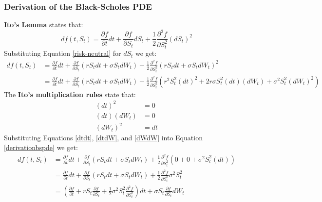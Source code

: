 \documentclass[12pt]{article}
\numberwithin{equation}{section}
\begin{document}
\subsubsection{Derivation of the Black-Scholes PDE}
\textbf{Ito's Lemma} states that:
\begin{equation}
	df(t,S_t) = \frac{\partial f}{\partial t} dt + \frac {\partial f}{\partial S_t} dS_t + \frac{1}{2}\frac{\partial^2 f}{\partial S_t^2}(dS_t)^2
	\label{ito}
\end{equation}
Substituting Equation \ref{risk-neutral} for $dS_t$ we get:
\begin{equation}
	\begin{aligned}
		df(t,S_t) 
		&= \frac{\partial f}{\partial t} dt 
		+ \frac{\partial f}{\partial S_t}
		\left(rS_tdt + \sigma S_t dW_t\right) 
		+ \frac{1}{2}\frac{\partial^2 f}{\partial S_t^2}
		\left(rS_tdt + \sigma S_t dW_t\right)^2 \\ 
		&= \frac{\partial f}{\partial t}dt
		+ \frac{\partial f}{\partial S_t}
		\left(rS_tdt + \sigma S_tdW_t\right)
		+ \frac{1}{2}
		\frac{\partial^2 f}{\partial S_t^2}
		\left(r^2S_t^2(dt)^2 + 2r\sigma S_t^2(dt)(dW_t) + \sigma^2S_t^2(dW_t)^2\right)
	\end{aligned}
	\label{derivationbspde}
\end{equation}
The\textbf{ Ito's multiplication rules} state that: 
\begin{align}
	(dt)^2 &= 0 	\label{dtdt}  \\
	(dt)(dW_t) &= 0 	\label{dtdW} \\
	(dW_t)^2 &= dt  	\label{dWdW}
\end{align}
\newline 
Substituting Equations \ref{dtdt}, \ref{dtdW}, and \ref{dWdW} into Equation 	\ref{derivationbspde} we get:
\begin{equation}
	\begin{aligned}
		df(t,S_t)  &= \frac{\partial f}{\partial t}dt
		+ \frac{\partial f}{\partial S_t}
		\left(rS_tdt + \sigma S_tdW_t\right)
		+ \frac{1}{2}
		\frac{\partial^2 f}{\partial S_t^2}
		\left(0 + 0 + \sigma^2S_t^2(dt)\right) \\
		&= \frac{\partial f}{\partial t}dt
		+ \frac{\partial f}{\partial S_t}
		\left(rS_tdt + \sigma S_tdW_t\right)
		+ \frac{1}{2}
		\frac{\partial^2 f}{\partial S_t^2}
		\sigma^2S_t^2  \\
		&= (\frac{\partial f}{\partial t} + rS_t \frac{\partial f}{\partial S_t} + 
		\frac{1}{2}\sigma^2S_t^2\frac{\partial^2 f}{\partial S_t^2}) dt + \sigma S_t \frac{\partial f}{\partial S_t}dW_t
	\end{aligned}
	\label{derivationbspde2}
\end{equation}
\end{document}
